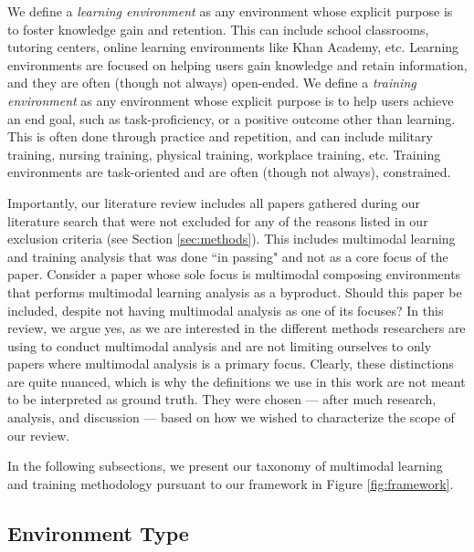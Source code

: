 \documentclass[manuscript,screen,review]{acmart}
\begin{document}
We define a \textit{learning environment} as any environment whose explicit purpose is to foster knowledge gain and retention. This can include school classrooms, tutoring centers, online learning environments like Khan Academy, etc. Learning environments are focused on helping users gain knowledge and retain information, and they are often (though not always) open-ended. We define a \textit{training environment} as any environment whose explicit purpose is to help users achieve an end goal, such as task-proficiency, or a positive outcome other than learning. This is often done through practice and repetition, and can include military training, nursing training, physical training, workplace training, etc. Training environments are task-oriented and are often (though not always), constrained. 

Importantly, our literature review includes all papers gathered during our literature search that were not excluded for any of the reasons listed in our exclusion criteria (see Section \ref{sec:methods}). This includes multimodal learning and training analysis that was done ``in passing" and not as a core focus of the paper. Consider a paper whose sole focus is multimodal composing environments that performs multimodal learning analysis as a byproduct. Should this paper be included, despite not having multimodal analysis as one of its focuses? In this review, we argue yes, as we are interested in the different methods researchers are using to conduct multimodal analysis and are not limiting ourselves to only papers where multimodal analysis is a primary focus. Clearly, these distinctions are quite nuanced, which is why the definitions we use in this work are not meant to be interpreted as ground truth. They were chosen --- after much research, analysis, and discussion --- based on how we wished to characterize the scope of our review.

In the following subsections, we present our taxonomy of multimodal learning and training methodology pursuant to our framework in Figure \ref{fig:framework}. 

\subsection{Environment Type}\label{subsec:environment_type} %
\end{document}
